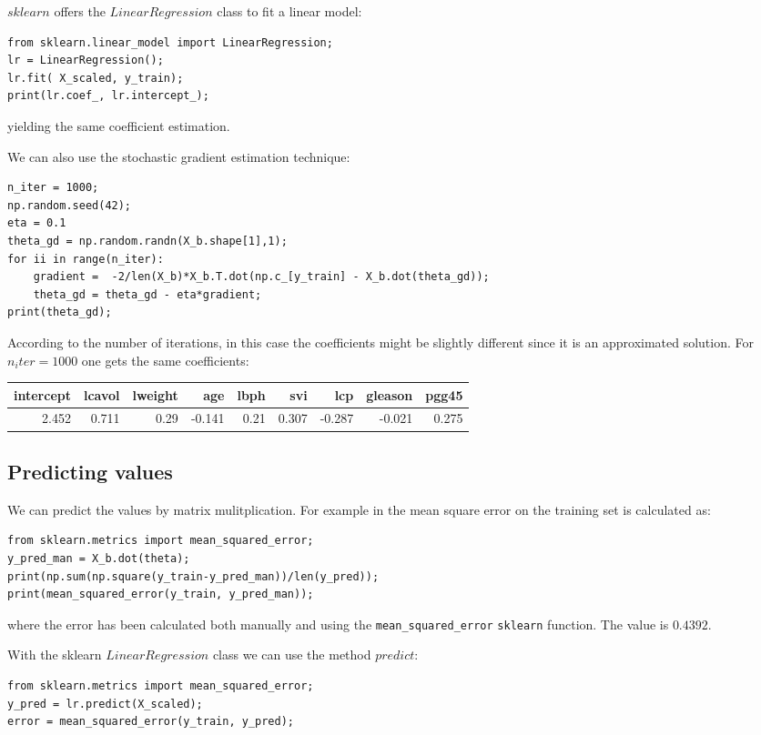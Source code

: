 \documentclass[12pt, letterpaper]{article}
\theoremstyle{definition}
\begin{document}
$sklearn$ offers the $LinearRegression$ class to fit a linear model:
\begin{lstlisting}
from sklearn.linear_model import LinearRegression;
lr = LinearRegression();
lr.fit( X_scaled, y_train);
print(lr.coef_, lr.intercept_);
\end{lstlisting}
yielding the same coefficient estimation.

We can also use the stochastic gradient estimation technique:
\begin{lstlisting}
n_iter = 1000;
np.random.seed(42);
eta = 0.1
theta_gd = np.random.randn(X_b.shape[1],1);
for ii in range(n_iter):
    gradient =  -2/len(X_b)*X_b.T.dot(np.c_[y_train] - X_b.dot(theta_gd));
    theta_gd = theta_gd - eta*gradient;
print(theta_gd);
\end{lstlisting}
According to the number of iterations, in this case the coefficients might be slightly different since it is an approximated solution. For $n_iter=1000$ one gets the same coefficients:

\begin{tabular}{rrrrrrrrr}
\toprule
 intercept &  lcavol &  lweight &    age &  lbph &    svi &    lcp &  gleason &  pgg45 \\
\midrule
     2.452 &   0.711 &     0.29 & -0.141 &  0.21 &  0.307 & -0.287 &   -0.021 &  0.275 \\
\bottomrule
\end{tabular}


\subsection{Predicting values}
We can predict the values by matrix mulitplication. For example in the mean square error on the training set is calculated as:
\begin{lstlisting}
from sklearn.metrics import mean_squared_error;
y_pred_man = X_b.dot(theta);
print(np.sum(np.square(y_train-y_pred_man))/len(y_pred));
print(mean_squared_error(y_train, y_pred_man));
\end{lstlisting}
where the error has been calculated both manually and using the \lstinline+mean_+\lstinline+squared_+\lstinline+error+ \lstinline+sklearn+ function. The value is $0.4392$.

With the sklearn $LinearRegression$ class we can use the method $predict$:
\begin{lstlisting}[label={lst:CustomLinearRegression}]
from sklearn.metrics import mean_squared_error;
y_pred = lr.predict(X_scaled);
error = mean_squared_error(y_train, y_pred);
\end{lstlisting}
\end{document}
